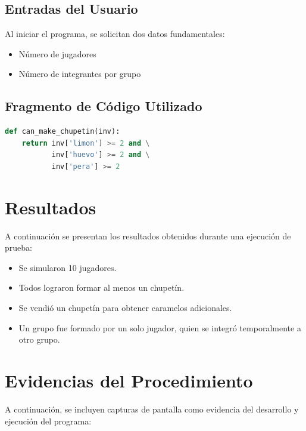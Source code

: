 \documentclass[12pt,spanish]{article}
\begin{document}
\subsection{Entradas del Usuario}

Al iniciar el programa, se solicitan dos datos fundamentales:

\begin{itemize}
  \item Número de jugadores
  \item Número de integrantes por grupo
\end{itemize}

\subsection{Fragmento de Código Utilizado}

\begin{lstlisting}[language=Python, caption={Validación para formar un chupetín}]
def can_make_chupetin(inv):
    return inv['limon'] >= 2 and \
           inv['huevo'] >= 2 and \
           inv['pera'] >= 2
\end{lstlisting}

\section{Resultados}

A continuación se presentan los resultados obtenidos durante una ejecución de prueba:

\begin{itemize}
  \item Se simularon 10 jugadores.
  \item Todos lograron formar al menos un chupetín.
  \item Se vendió un chupetín para obtener caramelos adicionales.
  \item Un grupo fue formado por un solo jugador, quien se integró temporalmente a otro grupo.
\end{itemize}

\section{Evidencias del Procedimiento}

A continuación, se incluyen capturas de pantalla como evidencia del desarrollo y ejecución del programa:
\end{document}
